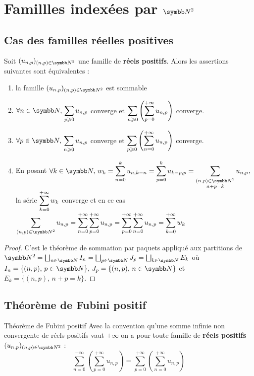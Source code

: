 \section{Famillles indexées par \texorpdfstring{$\N^2$}{N²}}
\subsection{Cas des familles réelles positives}

\begin{theoreme}{}{}
    Soit $(u_{n, p})_{(n, p) \in \N^2}$ une famille de \textbf{réels positifs}.
    Alors les assertions suivantes sont équivalentes :
    \begin{enumerate}
        \item la famille $(u_{n, p})_{(n, p) \in \N^2}$ est sommable
        \item $\ds \forall n \in \N, \, \sum_{p \geqslant 0 } u_{n, p}$ converge et $\displaystyle \sum_{n \geqslant 0} \left(\sum_{p = 0}^{+\infty} u_{n, p} \right)$ converge.
        \item $\ds \forall p \in \N, \, \sum_{n \geqslant 0 } u_{n, p}$ converge et $\displaystyle \sum_{p \geqslant 0} \left(\sum_{n = 0}^{+\infty} u_{n, p} \right)$ converge.
        \item En posant $\ds \forall k \in \N, \, w_k = \sum_{n = 0 }^{k }u_{n, k - n} = \sum_{p = 0 }^{k } u_{k - p, p} = \sum_{\substack{(n, p) \in \N^2 \\ n + p = k}} u_{n, p}$, la série $\displaystyle \sum_{k = 0}^{+\infty} w_k$ converge
            et en ce cas $\ds \sum_{(n, p) \in \N^2} u_{n,p} = \sum_{n = 0}^{+\infty} \sum_{p = 0}^{+\infty}u_{n, p} = \sum_{p = 0}^{+\infty} \sum_{n = 0}^{+\infty}u_{n, p} = \sum_{k = 0 }^{+\infty} w_k$ 
    \end{enumerate}
\end{theoreme}

\begin{proof}
    C'est le théorème de sommation par paquets appliqué aux partitions de
    $\N^2 = \bigsqcup_{n \in \N} I_n = \bigsqcup_{p \in \N} J_p = \bigsqcup_{k \in \N} E_k$
    où $I_n = \{ (n, p), \, p \in \N \}, \, J_p = \{ (n, p), \, n \in \N \}$ et
    $E_k = \{ (n, p), \, n + p = k \}$.
\end{proof}

\subsection{Théorème de Fubini positif}

\begin{theoreme}{Théorème de Fubini positif}{}
    Avec la convention qu'une somme infinie non convergente de réels positifs vaut 
    $+ \infty$ on a pour toute famille de \textbf{réels positifs} $(u_{n, p})_{(n, p) \in \N^2}$ :
    \[\sum_{n = 0}^{+\infty} \left(\sum_{p = 0}^{+\infty} u_{n, p} \right) = \sum_{p = 0}^{+\infty} \left( \sum_{n = 0}^{+\infty} u_{n, p} \right)\]
\end{theoreme}

